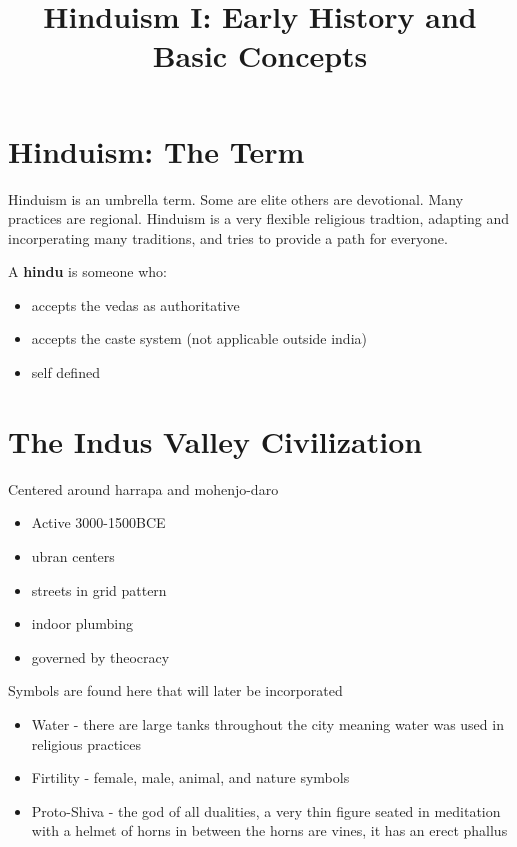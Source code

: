 \documentclass{article}
\begin{document}
\title{Hinduism I: Early History and Basic Concepts}
\maketitle

\section*{Hinduism: The Term}
\label{sec:hinduism_the_term}
Hinduism is an umbrella term. Some are elite others are devotional. Many practices are regional. Hinduism is a very flexible religious tradtion, adapting and incorperating many traditions, and tries to provide a path for everyone.

A \textbf{hindu} is someone who:
\begin{itemize}
	\item accepts the vedas as authoritative
	\item accepts the caste system (not applicable outside india)
	\item self defined
\end{itemize}

\section*{The Indus Valley Civilization}
\label{sec:the_indus_valley_civilization}
Centered around harrapa and mohenjo-daro
\begin{itemize}
	\item Active 3000-1500BCE
	\item ubran centers
	\item streets in grid pattern
	\item indoor plumbing
	\item governed by theocracy
\end{itemize}

Symbols are found here that will later be incorporated
\begin{itemize}
	\item Water - there are large tanks throughout the city meaning water was used in religious practices
	\item Firtility - female, male, animal, and nature symbols
	\item Proto-Shiva - the god of all dualities, a very thin figure seated in meditation with a helmet of horns in between the horns are vines, it has an erect phallus
\end{itemize}
\end{document}
